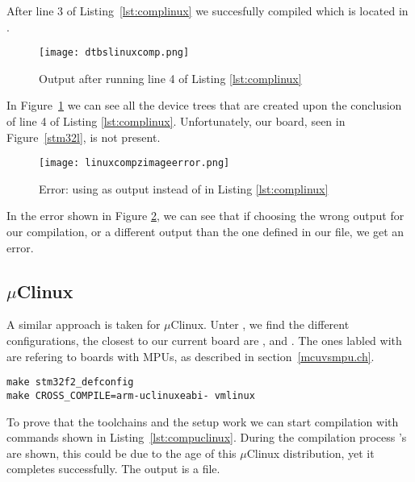 After line 3 of Listing~\ref{lst:complinux} we succesfully compiled  which is located in .

\begin{figure}[H]
\centering
\texttt{[image: dtbslinuxcomp.png]}
\caption{Output after running line 4 of Listing \ref{lst:complinux}}
\label{fig:linuxcompdtb}
\end{figure}

In Figure~\ref{fig:linuxcompdtb} we can see all the device trees that are created upon the conclusion of line 4 of Listing \ref{lst:complinux}. Unfortunately, our board, seen in Figure~\ref{stm32l}, is not present.

\begin{figure}[H]
\centering
\texttt{[image: linuxcompzimageerror.png]}
\caption{Error: using  as output instead of  in Listing \ref{lst:complinux}}
\label{fig:errorlinuxcompzimage}
\end{figure}

In the error shown in Figure \ref{fig:errorlinuxcompzimage}, we can see that if choosing the wrong output for our compilation, or a different output than the one defined in our  file, we get an error. 

\subsection{$\mu$Clinux}
A similar approach is taken for $\mu$Clinux. Unter , we find the different configurations, the closest to our current board are ,  and . The ones labled with  are refering to boards with MPUs, as described in section~\ref{mcuvsmpu.ch}. 


\begin{lstlisting}[style=SH, caption=Compiling $\mu$Clinux, label=lst:compuclinux]
make stm32f2_defconfig
make CROSS_COMPILE=arm-uclinuxeabi- vmlinux
\end{lstlisting}

To prove that the toolchains and the setup work we can start compilation with commands shown in Listing~\ref{lst:compuclinux}. During the compilation process 's are shown, this could be due to the age of this $\mu$Clinux distribution, yet it completes successfully. The output is a  file.


